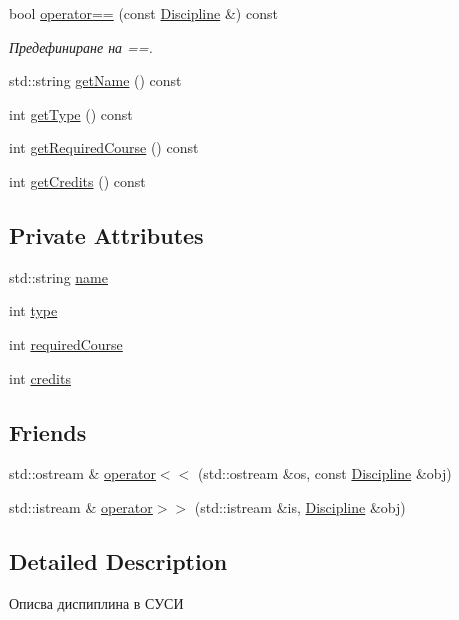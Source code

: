 \begin{DoxyCompactItemize}
bool \hyperlink{class_discipline_a44dbd9000f68f726aeed2bfcab64daf9}{operator==} (const \hyperlink{class_discipline}{Discipline} \&) const
\begin{DoxyCompactList}\small\item\em Предефиниране на ==. \end{DoxyCompactList}\item 
std\+::string \hyperlink{class_discipline_a13083fc60e9af78fb960d9a20d298f78}{get\+Name} () const
\item 
int \hyperlink{class_discipline_a54a87ad8c274c6ea4583b9d459416123}{get\+Type} () const
\item 
int \hyperlink{class_discipline_a4218ae936c5cc7615c631d425b0236a1}{get\+Required\+Course} () const
\item 
int \hyperlink{class_discipline_a03a84c2333ece637b1f144bb0e947cc0}{get\+Credits} () const
\end{DoxyCompactItemize}
\subsection*{Private Attributes}
\begin{DoxyCompactItemize}
\item 
std\+::string \hyperlink{class_discipline_aafa65128240ca298b7946e1c308c0d89}{name}
\item 
int \hyperlink{class_discipline_aef1d2d599f850961fb622cc726a79dca}{type}
\item 
int \hyperlink{class_discipline_a6b0447749bfb0daa386528721049d75e}{required\+Course}
\item 
int \hyperlink{class_discipline_a7285de200405bf7a8f7e56ddddc8cf4d}{credits}
\end{DoxyCompactItemize}
\subsection*{Friends}
\begin{DoxyCompactItemize}
\item 
std\+::ostream \& \hyperlink{class_discipline_a70a18bd0fe28be947317cf0e06e58942}{operator$<$$<$} (std\+::ostream \&os, const \hyperlink{class_discipline}{Discipline} \&obj)
\item 
std\+::istream \& \hyperlink{class_discipline_a8ef3bb5be1ffee2afd412602b0cdc57b}{operator$>$$>$} (std\+::istream \&is, \hyperlink{class_discipline}{Discipline} \&obj)
\end{DoxyCompactItemize}


\subsection{Detailed Description}
Описва диспиплина в СУСИ 

